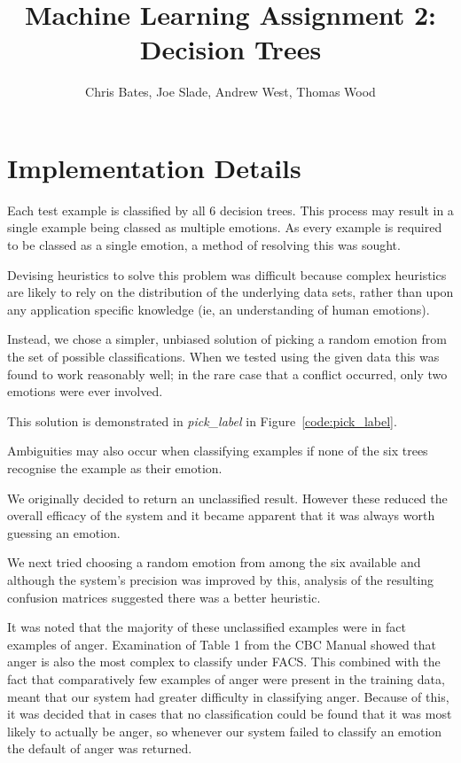 \documentclass[a4paper]{article}
\title{Machine Learning Assignment 2: Decision Trees}
\author{Chris Bates, Joe Slade, Andrew West, Thomas Wood}
\begin{document}
\maketitle
\section{Implementation Details}
Each test example is classified by all 6 decision trees. This process may
result in a single example being classed as multiple emotions. As every
example is required to be classed as a single emotion, a method of resolving
this was sought. 

Devising heuristics to solve this problem was difficult because complex
heuristics are likely to rely on the distribution of the underlying data
sets, rather than upon any application specific knowledge (ie, an
understanding of human emotions).

Instead, we chose a simpler, unbiased solution of picking a random emotion
from the set of possible classifications. When we tested using the given
data this was found to work reasonably well; in the rare case that a
conflict occurred, only two emotions were ever involved.

This solution is demonstrated in \emph{pick\_label} in
Figure~\ref{code:pick_label}.

Ambiguities may also occur when classifying examples if none of the six
trees recognise the example as their emotion.

We originally decided to return an unclassified result. However these 
reduced the overall efficacy of the system and it became apparent that it
was always worth guessing an emotion.

We next tried choosing a random emotion from among the six available and
although the system's precision was improved by this, analysis of the 
resulting confusion matrices suggested there was a better heuristic.

It was noted that the majority of these unclassified examples were in fact
examples of anger. Examination of Table 1 from the CBC Manual showed that
anger is also the most complex to classify under FACS. This combined with
the fact that comparatively few examples of anger were present in the
training data, meant that our system had greater difficulty in classifying
anger. Because of this, it was decided that in cases that no classification
could be found that it was most likely to actually be anger, so whenever our
system failed to classify an emotion the default of anger was returned.
\end{document}
